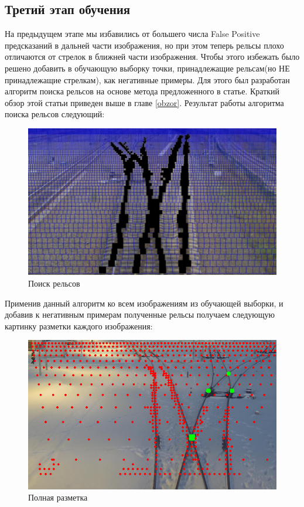 \subsection{Третий этап обучения}
На предыдущем этапе мы избавились от большего числа False Positive предсказаний в дальней части изображения, но при этом теперь рельсы плохо отличаются от стрелок в ближней части изображения. 
Чтобы этого избежать было решено добавить в обучающую выборку точки, принадлежащие рельсам(но НЕ принадлежащие стрелкам), как негативные примеры. Для этого был разработан алгоритм поиска рельсов на основе метода предложенного в статье\cite{b:growing_up}. Краткий обзор этой статьи приведен выше в главе \ref{obzor}. Результат работы алгоритма поиска рельсов следующий:
\begin{figure}[h!]
	\centering
	\includegraphics[width=0.7\linewidth]{pictures/screenshot2325}
	\caption{Поиск рельсов}
	\label{fig:screenshot2325}
\end{figure}
\newpage
Применив данный алгоритм ко всем изображениям из обучающей выборки, и добавив к негативным примерам полученные рельсы получаем следующую картинку разметки каждого изображения:
\begin{figure}[h!]
	\centering
	\includegraphics[width=0.7\linewidth]{pictures/full_dataset}
	\caption{Полная разметка}
	\label{fig:screenshot2325}
\end{figure}

